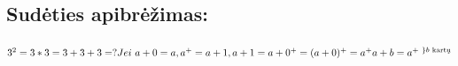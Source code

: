 \documentclass[fleqn]{article} %
\begin{document}
\subsection{Sudėties apibrėžimas:}
\begin{math}
    3^2 = 3 * 3 = 3 + 3 + 3 = ? \\
    \\
    Jei\ a + 0 = a, a^+ = a + 1, \\
    a + 1 = a + 0^+ = (a + 0)^+ = a^+ \\
    a + b = a^{+\ \}b \text{ kartų}}
\end{math} 
\end{document}
